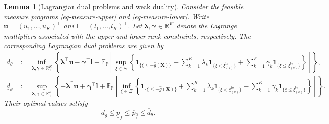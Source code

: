 \documentclass[review,11pt,3p,authoryear,nopreprintline]{elsarticle}
\newtheorem{lemma}{Lemma}
\begin{document}
\begin{lemma}[Lagrangian dual problems and weak duality]
  \label{lem-weak-duality}
  Consider the feasible measure programs \eqref{eq-measure-upper} and \eqref{eq-measure-lower}. Write $\bm u=(u_1,\ldots,u_K)^\top$ and $\bm l=(l_1,\ldots,l_K)^\top$. Let $\bm\lambda,\bm\gamma\in\mathbb R_+^K$ denote the Lagrange multipliers associated with the upper and lower rank constraints, respectively. The corresponding Lagrangian dual problems are given by
  \begin{align}
    \overline d_\theta
    &:=\inf_{\bm\lambda,\bm\gamma\in\mathbb R_+^K}
    \left\{\bm\lambda^\top\bm u-\bm\gamma^\top\bm l
    +\mathbb E_{\mathbb P}\left[\sup_{\xi\in\Xi}\left\{
    \mathbf1_{\{\xi\le-\hat g(\bm X)\}}
    -\sum_{k=1}^K\lambda_k\mathbf1_{\{\xi<\xi_{(k)}^{\mathrm{te}}\}}
    +\sum_{k=1}^K\gamma_k\mathbf1_{\{\xi\le\xi_{(k)}^{\mathrm{te}}\}}
    \right\}\right]\right\},
    \label{eq-upper-measure-dual}\\
    \underline d_\theta
    &:=\sup_{\bm\lambda,\bm\gamma\in\mathbb R_+^K}
    \left\{-\bm\lambda^\top\bm u+\bm\gamma^\top\bm l
    +\mathbb E_{\mathbb P}\left[\inf_{\xi\in\Xi}\left\{
    \mathbf1_{\{\xi\le-\hat g(\bm X)\}}
    +\sum_{k=1}^K\lambda_k\mathbf1_{\{\xi<\xi_{(k)}^{\mathrm{te}}\}}
    -\sum_{k=1}^K\gamma_k\mathbf1_{\{\xi\le\xi_{(k)}^{\mathrm{te}}\}}
    \right\}\right]\right\}.
    \label{eq-lower-measure-dual}
  \end{align}
  Their optimal values satisfy
  \begin{equation}
    \underline d_\theta\le\underline p_{\hat f}
    \le\overline p_{\hat f}\le\overline d_\theta.
    \label{eq-weak-duality}
  \end{equation}
\end{lemma}
\end{document}

